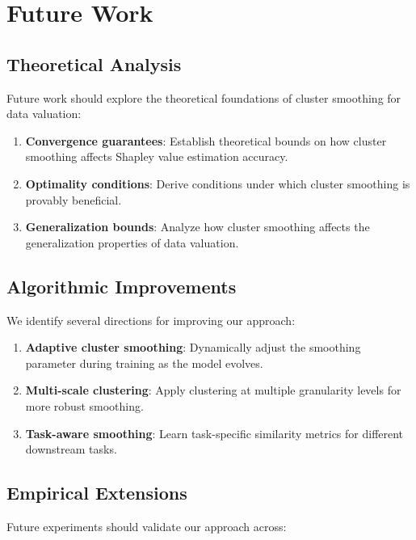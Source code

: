 \documentclass[12pt,a4paper]{report}
\begin{document}
\section{Future Work}
\label{sec:future}

\subsection{Theoretical Analysis}
\label{sec:future_theory}

Future work should explore the theoretical foundations of cluster smoothing for data valuation:

\begin{enumerate}
    \item \textbf{Convergence guarantees}: Establish theoretical bounds on how cluster smoothing affects Shapley value estimation accuracy.
    \item \textbf{Optimality conditions}: Derive conditions under which cluster smoothing is provably beneficial.
    \item \textbf{Generalization bounds}: Analyze how cluster smoothing affects the generalization properties of data valuation.
\end{enumerate}

\subsection{Algorithmic Improvements}
\label{sec:future_algo}

We identify several directions for improving our approach:

\begin{enumerate}
    \item \textbf{Adaptive cluster smoothing}: Dynamically adjust the smoothing parameter during training as the model evolves.
    \item \textbf{Multi-scale clustering}: Apply clustering at multiple granularity levels for more robust smoothing.
    \item \textbf{Task-aware smoothing}: Learn task-specific similarity metrics for different downstream tasks.
\end{enumerate}

\subsection{Empirical Extensions}
\label{sec:future_empirical}

Future experiments should validate our approach across:
\end{document}
